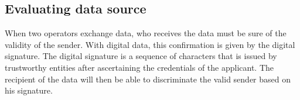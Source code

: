 \subsection{Evaluating data source}
When two operators exchange data, who receives the data must be sure of the validity of the sender.
With digital data, this confirmation is given by the digital signature. The digital signature is a sequence of characters that is issued by trustworthy entities after ascertaining the credentials of the applicant. The recipient of the data will then be able to discriminate the valid sender based on his signature.

